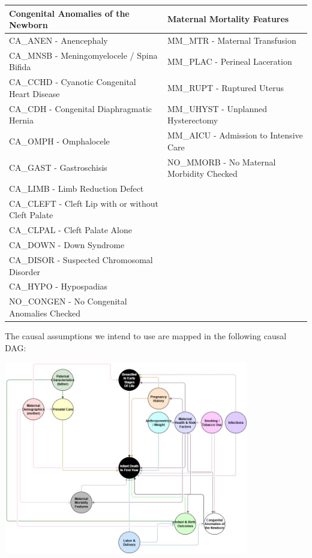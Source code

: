 \documentclass[a4paper,12pt]{article} %
\begin{document}
\begin{table}[H]
\centering
\small
\begin{tabular}{|>{\columncolor{cog_anomal}}l|>{\columncolor{maternal_mortality}}l|}
\hline
\textbf{Congenital Anomalies of the Newborn} & \textbf{Maternal Mortality Features} \\
\hline
CA\_ANEN -  Anencephaly& MM\_MTR -  Maternal Transfusion\\
CA\_MNSB -  Meningomyelocele / Spina Bifida& MM\_PLAC -  Perineal Laceration\\
CA\_CCHD -  Cyanotic Congenital Heart Disease& MM\_RUPT -  Ruptured Uterus\\
CA\_CDH -  Congenital Diaphragmatic Hernia& MM\_UHYST -  Unplanned Hysterectomy\\
CA\_OMPH -  Omphalocele& MM\_AICU -  Admission to Intensive Care\\
CA\_GAST -  Gastroschisis& NO\_MMORB -  No Maternal Morbidity Checked\\
CA\_LIMB -  Limb Reduction Defect&  \\
CA\_CLEFT -  Cleft Lip with or without Cleft Palate&  \\
CA\_CLPAL -  Cleft Palate Alone&  \\
CA\_DOWN -  Down Syndrome&  \\
CA\_DISOR -  Suspected Chromosomal Disorder&  \\
CA\_HYPO -  Hypospadias&  \\
NO\_CONGEN -  No Congenital Anomalies Checked&  \\
\hline
\end{tabular}
\end{table}


The causal assumptions we intend to use are mapped in the following causal DAG:

\begin{center}
\includegraphics[width=0.8\textwidth]{causal_graph.jpg}
\end{center}
\end{document}
